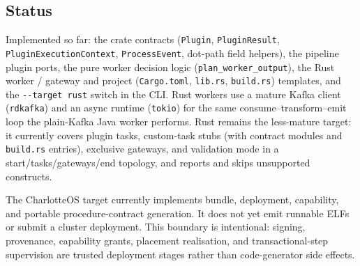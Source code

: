 \subsection{Status}

Implemented so far: the crate contracts (\texttt{Plugin}, \texttt{PluginResult},
\texttt{PluginExecutionContext}, \texttt{ProcessEvent}, dot-path field helpers), the
pipeline plugin ports, the pure worker decision logic (\texttt{plan\_worker\_output}),
the Rust worker / gateway and project (\texttt{Cargo.toml}, \texttt{lib.rs},
\texttt{build.rs}) templates, and the \texttt{-{}-target rust} switch in the CLI. Rust
workers use a mature Kafka client (\texttt{rdkafka}) and an async runtime
(\texttt{tokio}) for the same consume--transform--emit loop the plain-Kafka Java
worker performs. Rust remains the less-mature target: it currently covers plugin
tasks, custom-task stubs (with contract modules and \texttt{build.rs} entries),
exclusive gateways, and validation mode in a start/tasks/gateways/end topology, and
reports and skips unsupported constructs.

The CharlotteOS target currently implements bundle, deployment, capability, and
portable procedure-contract generation. It does not yet emit runnable ELFs or
submit a cluster deployment. This boundary is intentional: signing, provenance,
capability grants, placement realisation, and transactional-step supervision are
trusted deployment stages rather than code-generator side effects.
